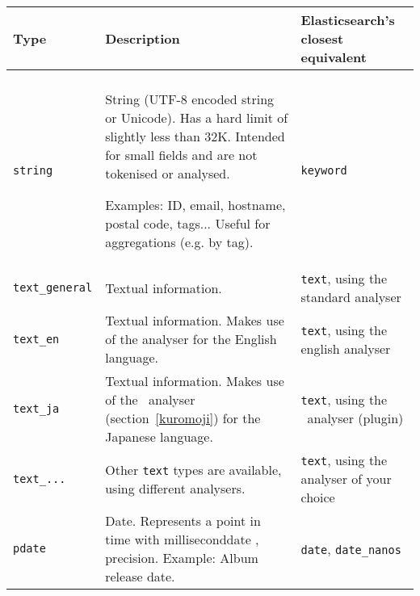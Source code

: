 \begin{longtable}{| p{2.5cm} p{7.5cm} p{3.5cm} |}
	\hline
	Type
	&
	Description 
	& 
	
	Elasticsearch's \newline
	closest 
	equivalent 	
	\\
	\hline
	& & \\
	\endhead
	
	\hline
	\endfoot
	
	\texttt{string}
	&
	String (UTF-8 encoded string or Unicode).
	Has a hard limit of slightly less than 32K.
	Intended for small fields and are not tokenised or
	analysed.
	
	Examples: ID, email, hostname, postal code, tags...
	Useful for aggregations (e.g. by tag).
	
	& 
	\texttt{keyword}
	\\
	
	
	\texttt{text\_general}
	&
	Textual information.
	&
	\texttt{text}, \newline
	using the standard analyser \newline
	\\
	
	
	\texttt{text\_en}
	&
	Textual information. \newline
	Makes use of the analyser for the English language.
	&
	\texttt{text}, \newline
	using the english analyser \newline
	\\
	
	
	\texttt{text\_ja}
	&
	Textual information. \newline
	Makes use of the \kuromoji\ analyser (section~\ref{kuromoji}) for the Japanese language.
	&
	\texttt{text}, \newline
	using the \kuromoji\ analyser (plugin) \newline
	\\
	
	
	\texttt{text\_...}
	&
	Other \texttt{text} types are available, using different
	analysers.
	&
	\texttt{text}, \newline
	using the 
	analyser of your choice \newline
	\\
	
	
	\texttt{pdate}
	&
	Date. \newline
	Represents a point in time with milliseconddate ,
	precision.  \newline
	Example: Album release date. \newline
	&
	\texttt{date}, \newline
	\texttt{date\_nanos}
	\\
	
\end{longtable}


